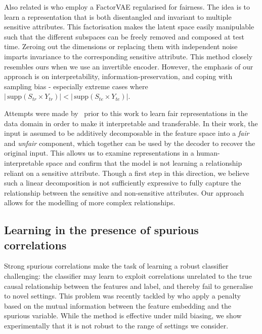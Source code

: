 Also related is \citet{creager2019flexibly} who employ a FactorVAE \citep{kim2018disentangling} regularised for fairness.
The idea is to learn a representation that is both disentangled and invariant to multiple sensitive attributes.
This factorisation makes the latent space easily manipulable such that the different subspaces can be freely removed and composed at test time.
Zeroing out the dimensions or replacing them with independent noise imparts invariance to the corresponding sensitive attribute.
This method closely resembles ours when we use an invertible encoder.
However, the emphasis of our approach is on interpretability, information-preservation, and coping with sampling bias - especially extreme cases where $|\, \textrm{supp}(S_{tr} \times Y_{tr}) | < |\, \textrm{supp}(S_{te} \times Y_{te}) |$.

Attempts were made by~\citet{QuaShaTho19} prior to this work to learn fair representations in the data domain in order to make it interpretable and transferable.
In their work, the input is assumed to be additively decomposable in the feature space into a \emph{fair} and \emph{unfair} component, which together can be used by the decoder to recover the original input.
This allows us to examine representations in a human-interpretable space and confirm that the model is not learning a relationship reliant on a sensitive attribute.
Though a first step in this direction, we believe such a linear decomposition is not sufficiently expressive to fully capture the relationship between the sensitive and non-sensitive attributes.
Our approach allows for the modelling of more complex relationships.

\subsection{Learning in the presence of spurious correlations}
Strong spurious correlations make the task of learning a robust classifier challenging: the classifier may learn to exploit correlations unrelated to the true causal relationship between the features and label, and thereby fail to generalise to novel settings.
This problem was recently tackled by \citet{kim2019learning} who apply a penalty based on the mutual information between the feature embedding and the spurious variable. 
While the method is effective under mild biasing, we show experimentally that it is not robust to the range of settings we consider.

